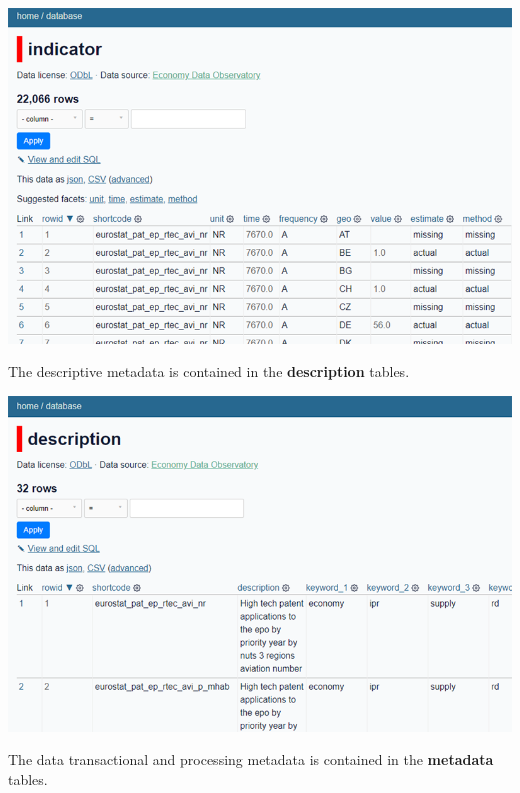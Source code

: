 \documentclass[
  a4paper,
  openany, a4paper, oneside]{book}
\begin{document}
\begin{center}\includegraphics[width=11.11in]{plots/screenshots/EDO_API_indicator_table} \end{center}

The descriptive metadata is contained in the \textbf{description} tables.

\begin{center}\includegraphics[width=11.11in]{plots/screenshots/EDO_API_description_table} \end{center}

The data transactional and processing metadata is contained in the \textbf{metadata} tables.
\end{document}
